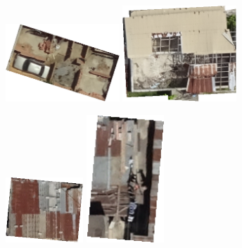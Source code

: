 \documentclass[11pt]{article}
\begin{document}
\begin{figure}
\begin{subfigure}[c]{0.32\textwidth}
	\end{subfigure}
	\begin{subfigure}[c]{0.32\textwidth}
		\includegraphics[width=0.47\textwidth]{figures/mat_examples/inc1.png}		
		\includegraphics[width=0.47\textwidth]{figures/mat_examples/inc2.png}
	\end{subfigure}
	\begin{subfigure}[c]{0.32\textwidth}
		\includegraphics[width=0.32\textwidth]{figures/mat_examples/irr1.png}		
		\includegraphics[width=0.32\textwidth]{figures/mat_examples/irr2.png}

\end{subfigure}
\end{figure}
\end{document}
